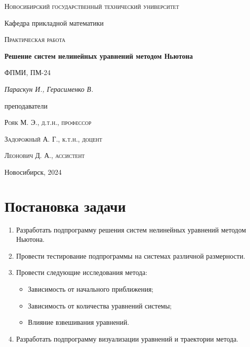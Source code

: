\documentclass[12pt, a4paper]{article}
\begin{document}
\begin{titlepage}
  \centering
  \textsc{Новосибирский государственный технический университет}\par
  \vspace{1mm}
  Кафедра прикладной математики\par
  \vspace{7cm}
  \textsc{Практическая работа }\par
  {\huge\bfseries Решение систем нелинейных уравнений методом Ньютона\par}
  \vspace{1cm}
  {\scriptsize ФПМИ, ПМ-24\par}
  \vspace{1mm}
  {\itshape\large Параскун И., Герасименко В.\par}
  \vfill
  {\small преподаватели\par}
  \vspace{2mm}
  \textsc{Рояк М. Э., д.т.н., профессор}\par
  \vspace{1mm}
  \textsc{Задорожный А. Г., к.т.н., доцент}\par
  \vspace{1mm}
  \textsc{Леонович Д. А., ассистент}\par
  \vfill
  \large{Новосибирск, 2024}
\end{titlepage}

\newpage

\setcounter{page}{2}
\tableofcontents

\newpage

\section{Постановка задачи}
\begin{enumerate}
  \item Разработать подпрограмму решения систем нелинейных уравнений методом Ньютона.
  \item Провести тестирование подпрограммы на системах различной размерности.
  \item Провести следующие исследования метода:
    \begin{itemize}
      \item Зависимость от начального приближения;
      \item Зависимость от количества уравнений системы;
      \item Влияние взвешивания уравнений.
    \end{itemize}
  \item Разработать подпрограмму визуализации уравнений и траектории метода.
\end{enumerate}
\end{document}

